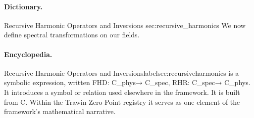 \paragraph{Dictionary.}
Recursive Harmonic Operators and Inversions sec:recursive\_harmonics We now define spectral transformations on our fields.

\paragraph{Encyclopedia.}
Recursive Harmonic Operators and Inversionslabelsec:recursiveharmonics is a symbolic expression, written FHD: C\_phys→ C\_spec, RHR: C\_spec→ C\_phys. It introduces a symbol or relation used elsewhere in the framework. It is built from C. Within the Trawin Zero Point registry it serves as one element of the framework's mathematical narrative.
